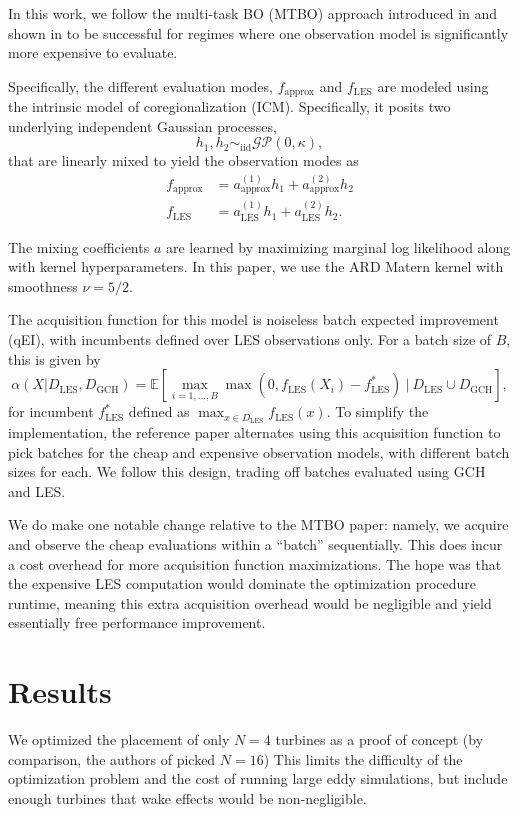 \documentclass[11pt]{article}
\begin{document}
In this work, we follow the multi-task BO (MTBO) approach introduced in
\cite{swerskyMultiTaskBayesianOptimization2013} and shown in \cite{lethamBayesianOptimizationPolicy2019}
to be successful for regimes where one observation model is
significantly more expensive to evaluate.

Specifically, the different evaluation modes, $f_\text{approx}$ and
$f_\text{LES}$ are modeled using the intrinsic model of coregionalization (ICM).
Specifically, it posits two underlying independent Gaussian processes,
\[
    h_{1}, h_{2} \sim_{\text{iid}} \mathcal{GP}(0, \kappa)
,\]
that are linearly mixed to yield the observation modes as
\begin{align*}
    f_\text{approx} &= a^{(1)}_\text{approx} h_1 + a^{(2)}_\text{approx} h_{2} \\
    f_\text{LES} &= a^{(1)}_\text{LES} h_1 + a^{(2)}_\text{LES} h_{2}
.\end{align*}

The mixing coefficients $a$ are learned by maximizing marginal log
likelihood along with kernel hyperparameters. In this paper, we use the ARD Matern kernel with
smoothness $\nu = 5 / 2$.

The acquisition function for this model is noiseless batch expected improvement
(qEI), with incumbents defined over LES observations only. For a batch size of
$B$, this is given by
\[
    \alpha (X | D_\text{LES}, D_\text{GCH}) = \mathbb{E} \left[
        \max_{i = 1, \ldots , B} \max\left(0, f_\text{LES}(X_i) - f_\text{LES}^* \right) \ \big| \
        D_\text{LES} \cup D_\text{GCH}
    \right]
,\] 
for incumbent $f^*_\text{LES}$ defined as $\max_{x \in D_\text{LES}}
f_\text{LES}(x)$. To simplify the implementation, the reference paper
\cite{lethamBayesianOptimizationPolicy2019} alternates using this acquisition function
to pick batches for the cheap and expensive observation models, with different batch sizes for each.
We follow this design, trading off batches evaluated using GCH and LES.

We do make one notable change relative to the MTBO paper: namely, we acquire
and observe the cheap evaluations within a ``batch'' sequentially. This does incur
a cost overhead for more acquisition function maximizations. The hope was that
the expensive LES computation would dominate the optimization procedure runtime,
meaning this extra acquisition overhead would be negligible and yield essentially free
performance improvement.

\section{Results}
We optimized the placement of only $N = 4$ turbines as a proof of concept (by
comparison, the authors of \cite{bempedelisDatadrivenOptimisationWind2024}
picked $N = 16$) This limits the difficulty of the optimization problem and
the cost of running large eddy simulations, but include enough turbines that
wake effects would be non-negligible.
\end{document}
